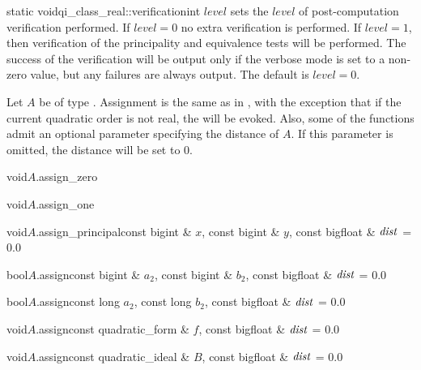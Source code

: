 \begin{fcode}{static void}{qi_class_real::verification}{int $\mathit{level}$}
  sets the $\mathit{level}$ of post-computation verification performed.  If $\mathit{level} = 0$
  no extra verification is performed.  If $\mathit{level} = 1$, then verification of the
  principality and equivalence tests will be performed.  The success of the verification will be
  output only if the verbose mode is set to a non-zero value, but any failures are always
  output.  The default is $\mathit{level} = 0$.
\end{fcode}



\ASGN

Let $A$ be of type .  Assignment is the same as in , with the
exception that if the current quadratic order is not real, the \LEH will be evoked.  Also, some
of the functions admit an optional parameter specifying the distance of $A$.  If this parameter
is omitted, the distance will be set to $0$.

\begin{fcode}{void}{$A$.assign_zero}{}
\end{fcode}

\begin{fcode}{void}{$A$.assign_one}{}
\end{fcode}

\begin{fcode}{void}{$A$.assign_principal}{const bigint & $x$, const bigint & $y$,
    const bigfloat & $\mathit{dist}$ = 0.0}%
\end{fcode}

\begin{fcode}{bool}{$A$.assign}{const bigint & $a_2$, const bigint & $b_2$,
    const bigfloat & $\mathit{dist}$ = 0.0}%
\end{fcode}

\begin{fcode}{bool}{$A$.assign}{const long $a_2$, const long $b_2$,
    const bigfloat & $\mathit{dist}$ = 0.0}%
\end{fcode}

\begin{fcode}{void}{$A$.assign}{const quadratic_form & $f$,
    const bigfloat & $\mathit{dist}$ = 0.0}
\end{fcode}

\begin{fcode}{void}{$A$.assign}{const quadratic_ideal & $B$,
    const bigfloat & $\mathit{dist}$ = 0.0}
\end{fcode}

